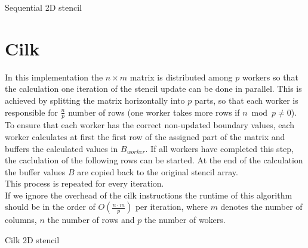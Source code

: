 \documentclass[11pt,a4paper]{article}
\begin{document}
\begin{algorithm}[H] \label{algo:seq_one_vec}
 
 \caption{Sequential 2D stencil}
\end{algorithm}


\section{Cilk}
In this implementation the $n\times m$ matrix is distributed among $p$ workers so that the calculation one iteration of the stencil update can be done in parallel. This is achieved by splitting the matrix horizontally into $p$ parts, so that each worker is responsible for $\frac{n}{p}$ number of rows (one worker takes more rows if $n \bmod p \neq 0$).\\
To ensure that each worker has the correct non-updated boundary values, each worker calculates at first the first row of the assigned part of the matrix and buffers the calculated values in $B_{worker}$. If all workers have completed this step, the caclulation of the following rows can be started. At the end of the calculation the buffer values $B$ are copied back to the original stencil array.\\
This process is repeated for every iteration.\\
If we ignore the overhead of the cilk instructions the runtime of this algorithm should be in the order of $O(\frac{n \cdot m}{p})$ per iteration, where $m$ denotes the number of columns, $n$ the number of rows and $p$ the number of wokers.

\begin{algorithm}[H] \label{algo:cilk}
 \caption{Cilk 2D stencil}
\end{algorithm}
\end{document}
